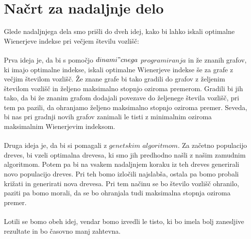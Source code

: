 \documentclass[a4paper]{article}
\begin{document}
\section{Načrt za nadaljnje delo}

Glede nadaljnjega dela smo prišli do dveh idej, kako bi lahko iskali optimalne Wienerjeve indekse pri večjem številu vozlišč:
\\
\\
Prva ideja je, da bi s pomočjo $dinami"cnega$ $programiranja$ in že znanih grafov, ki imajo optimalne indekse,
iskali optimalne Wienerjeve indekse še za grafe z večjim številom vozlišč. Že znane grafe bi tako gradili do grafov 
z željenim številom vozlišč in željeno maksimalno stopnjo oziroma premerom. Gradili bi jih tako, da bi že znanim 
grafom dodajali povezave do željenege števila vozlišč, pri tem pa pazili, da ohranjamo željeno maksimalno stopnjo 
oziroma premer. Seveda, bi nas pri gradnji novih grafov zanimali le tisti z minimalnim oziroma maksimalnim Wienerjevim indeksom.
\\
\\
Druga ideja je, da bi si pomagali z $genetskim$ $algoritmom$.  Za začetno populacijo dreves, bi vzeli optimalna drevesa,
ki smo jih predhodno našli z našim zamudnim algoritmom. Potem pa bi na vsakem nadaljnjem koraku iz teh dreves 
generirali novo populacijo dreves. Pri teh bomo izločili najslabša, ostala pa bomo probali križati in generirati nova drevesa.
Pri tem načinu se bo število vozlišč ohranilo, paziti pa bomo morali, da se bo ohranjala tudi maksimalna stopnja oziroma premer.
\\
\\
Lotili se bomo obeh idej, vendar bomo izvedli le tisto, ki bo imela bolj zanesljive rezultate in bo časovno manj zahtevna.
\end{document}
